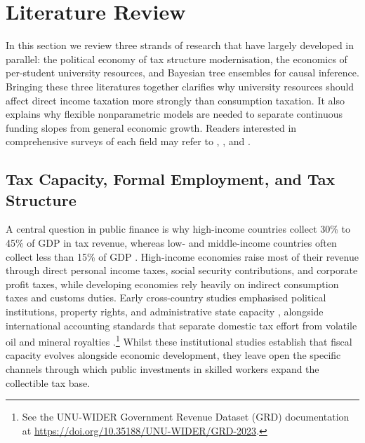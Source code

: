 \documentclass[11pt,a4paper]{article}
\begin{document}
\section{Literature Review}
\label{sec:lit}

In this section we review three strands of research that have largely developed in parallel: the political economy of tax structure modernisation, the economics of per-student university resources, and Bayesian tree ensembles for causal inference. Bringing these three literatures together clarifies why university resources should affect direct income taxation more strongly than consumption taxation. It also explains why flexible nonparametric models are needed to separate continuous funding slopes from general economic growth. Readers interested in comprehensive surveys of each field may refer to \citet{besley2014pillars}, \citet{deming2022four}, and \citet{hill2020bayesian}.

\subsection{Tax Capacity, Formal Employment, and Tax Structure}

A central question in public finance is why high-income countries collect 30\% to 45\% of GDP in tax revenue, whereas low- and middle-income countries often collect less than 15\% of GDP \citep{besley2009origins, gordon2009tax, besley2014pillars}. High-income economies raise most of their revenue through direct personal income taxes, social security contributions, and corporate profit taxes, while developing economies rely heavily on indirect consumption taxes and customs duties. Early cross-country studies emphasised political institutions, property rights, and administrative state capacity \citep{besley2009origins, kaufmann2011worldwide}, alongside international accounting standards that separate domestic tax effort from volatile oil and mineral royalties \citep{prichard2016reassessing, ictd2023grdv}.\footnote{See the UNU-WIDER Government Revenue Dataset (GRD) documentation at \url{https://doi.org/10.35188/UNU-WIDER/GRD-2023}.} Whilst these institutional studies establish that fiscal capacity evolves alongside economic development, they leave open the specific channels through which public investments in skilled workers expand the collectible tax base.
\end{document}
